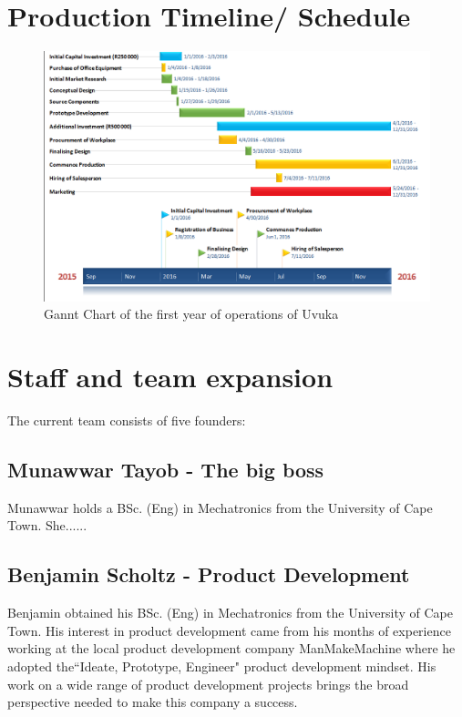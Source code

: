 \section{Production Timeline/ Schedule}
\begin{figure}[H]
\centering
\includegraphics[width=1\textwidth]{Gantt_2016.PNG}
\vskip10pt
\caption[Gannt Chart of the first year of operations of Uvuka]{Gannt Chart of the first year of operations of Uvuka}
\label{fig:Gantt Chart 1}
\end{figure}

\pagebreak
\section{Staff and team expansion} 

The current team consists of five founders:
\subsection{Munawwar Tayob - The big boss}
Munawwar holds a BSc. (Eng) in Mechatronics from the University of Cape Town. She......

\subsection{Benjamin Scholtz - Product Development}
Benjamin obtained his BSc. (Eng) in Mechatronics from the University of Cape Town. His interest in product development came from his months of experience working at the local product development company ManMakeMachine where he adopted the``Ideate, Prototype, Engineer" product development mindset. His work on a wide range of product development projects brings the broad perspective needed to make this company a success.  

